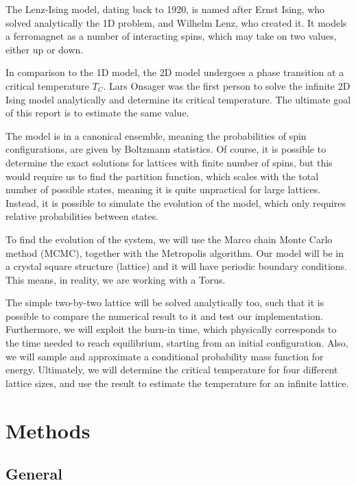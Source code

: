 \documentclass[english,notitlepage,reprint,nofootinbib]{revtex4-1}  %
\begin{document}
The Lenz-Ising model, dating back to 1920, is named after Ernst Ising, who solved analytically the 1D problem, and Wilhelm Lenz, who created it. It models a ferromagnet as a number of interacting spins, which may take on two values, either up or down. 

In comparison to the 1D model, the 2D model undergoes a phase transition at a critical temperature $T_C$. Lars Onsager was the first person to solve the infinite 2D Ising model analytically and determine its critical temperature. The ultimate goal of this report is to estimate the same value.

The model is in a canonical ensemble, meaning the probabilities of spin configurations, are given by Boltzmann statistics. Of course, it is possible to determine the exact solutions for lattices with finite number of spins, but this would require us to find the partition function, which scales with the total number of possible states, meaning it is quite unpractical for large lattices. Instead, it is possible to simulate the evolution of the model, which only requires relative probabilities between states.

To find the evolution of the system, we will use the Marco chain Monte Carlo method (MCMC), together with the Metropolis algorithm. Our model will be in a crystal square structure (lattice) and it will have periodic boundary conditions. This means, in reality, we are working with a Torus. 

The simple two-by-two lattice will be solved analytically too, such that it is possible to compare the numerical result to it and test our implementation. Furthermore, we will exploit the burn-in time, which physically corresponds to the time needed to reach equilibrium, starting from an initial configuration. Also, we will sample and approximate a conditional probability mass function for energy. Ultimately, we will determine the critical temperature for four different lattice sizes, and use the result to estimate the temperature for an infinite lattice.












\section{Methods}\label{sec:methods}
%
\subsection{General}\label{sec:General}
\end{document}
